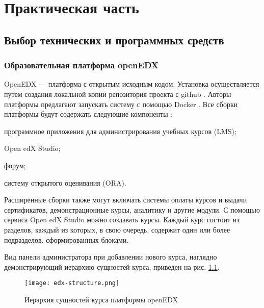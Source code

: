 \chapter{Практическая часть}

\section{Выбор технических и программных средств}
\subsection{Образовательная платформа openEDX}
OpenEDX — платформа с открытым исходным кодом. Установка осуществляется путем создания локальной копии репозитория проекта с github \cite{edx-github}. Авторы платформы предлагают запускать систему с помощью Docker \cite{docker}. Все сборки платформы будут содержать следующие компоненты \cite{edx-install}:
\begin{itemize*}
	\item программное приложения для администрирования учебных курсов (LMS);
	\item Open edX Studio;
	\item форум;
	\item систему открытого оценивания (ORA).
\end{itemize*}


Расширенные сборки также могут включать системы оплаты курсов и выдачи сертификатов, демонстрационные курсы, аналитику и другие модули. С помощью сервиса Open edX Studio можно создавать курсы. Каждый курс состоит из разделов, каждый из которых, в свою очередь, содержит один или более подразделов, сформированных блоками. 

Вид панели администратора при добавлении нового курса, наглядно демонстрирующий иерархию сущностей курса, приведен на рис. \ref{fig:edx-structure}.

\begin{figure}[htbp]
	\centering
	\texttt{[image: edx-structure.png]}
	\caption{Иерархия сущностей курса платформы openEDX}%
	\label{fig:edx-structure}
\end{figure}

